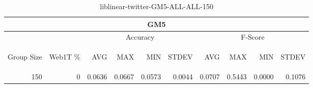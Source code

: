 \begin{center}
\begin{table}[htbp] 
 \begin{center}
\begin{tabular}{ | r | r | r | r | r | r | r | r | r | r |}
\hline
\multicolumn{10}{|c|}{GM5}\\
\hline
 & & \multicolumn{4}{|c|}{Accuracy} & \multicolumn{4}{|c|}{F-Score}\\ \cline{3-10}
\begin{sideways}Group Size\end{sideways} & \begin{sideways}Web1T \%\end{sideways} & \begin{sideways}AVG\end{sideways} & \begin{sideways}MAX\end{sideways} & \begin{sideways}MIN\end{sideways} & \begin{sideways}STDEV\end{sideways} & \begin{sideways}AVG\end{sideways} & \begin{sideways}MAX\end{sideways} & \begin{sideways}MIN\end{sideways} & \begin{sideways}STDEV\end{sideways}\\
\hline
\multirow{0}{*}{150}
 & 0 & 0.0636 & 0.0667 & 0.0573 & 0.0044 & 0.0707 & 0.5443 & 0.0000 & 0.1076\\ \cline{2-10}
\hline
\end{tabular}
\caption{liblinear-twitter-GM5-ALL-ALL-150}
\label{table:liblinear-twitter-GM5-ALL-ALL-150}
\end{center}
 \end{table}
\end{center}


